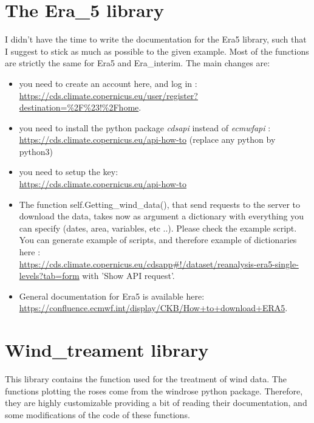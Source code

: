\documentclass[12pt]{article}
\begin{document}
\section{The Era\_5 library}
I didn't have the time to write the documentation for the Era5 library, such that I suggest to stick as much as possible to the given example.
Most of the functions are strictly the same for Era5 and Era\_interim. The main changes are:
\begin{itemize}
	\item you need to create an account here, and log in : \\
	\url{https://cds.climate.copernicus.eu/user/register?destination=%2F%23!%2Fhome}.
	\item you need to install the python package \textit{cdsapi} instead of \textit{ecmwfapi} : \\
	\url{https://cds.climate.copernicus.eu/api-how-to} (replace any python by python3)
	\item you need to setup the key: \\
	\url{https://cds.climate.copernicus.eu/api-how-to}
	\item The function self.Getting\_wind\_data(), that send requests to the server to download the data, takes now as argument a dictionary with everything you can specify (dates, area, variables, etc ..). Please check the example script. You can generate example of scripts, and therefore example of dictionaries here : \\
	\url{https://cds.climate.copernicus.eu/cdsapp#!/dataset/reanalysis-era5-single-levels?tab=form} with 'Show API request'.
	\item General documentation for Era5 is available here: \\
	\url{https://confluence.ecmwf.int/display/CKB/How+to+download+ERA5}.
\end{itemize}

\section{Wind\_treament library}
This library contains the function used for the treatment of wind data. The functions plotting the roses come from the windrose python package. Therefore, they are highly customizable providing a bit of reading their documentation, and some modifications of the code of these functions.
\end{document}
